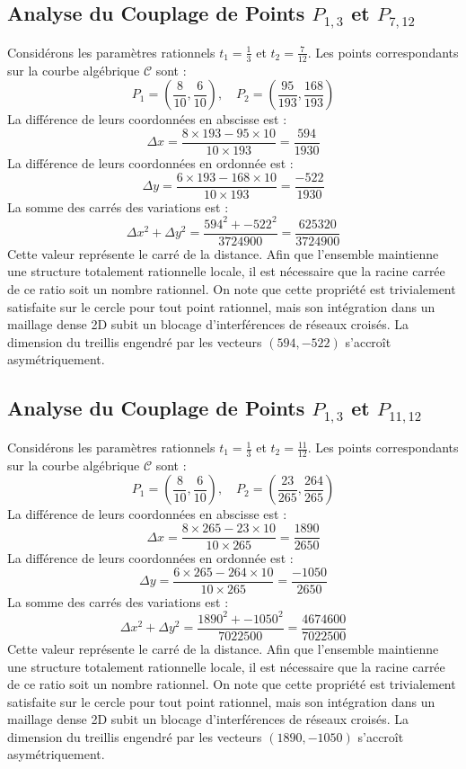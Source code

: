 \documentclass[12pt, a4paper]{article}
\begin{document}
\subsection{Analyse du Couplage de Points $P_{1,3}$ et $P_{7,12}$}
Considérons les paramètres rationnels $t_1 = \frac{1}{3}$ et $t_2 = \frac{7}{12}$.
Les points correspondants sur la courbe algébrique $\mathcal{C}$ sont :
$$ P_1 = \left( \frac{8}{10}, \frac{6}{10} \right), \quad P_2 = \left( \frac{95}{193}, \frac{168}{193} \right) $$
La différence de leurs coordonnées en abscisse est :
$$ \Delta x = \frac{8 \times 193 - 95 \times 10}{10 \times 193} = \frac{594}{1930} $$
La différence de leurs coordonnées en ordonnée est :
$$ \Delta y = \frac{6 \times 193 - 168 \times 10}{10 \times 193} = \frac{-522}{1930} $$
La somme des carrés des variations est :
$$ \Delta x^2 + \Delta y^2 = \frac{ 594^2 + -522^2 }{ 3724900 } = \frac{ 625320 }{ 3724900 } $$
Cette valeur représente le carré de la distance. Afin que l'ensemble maintienne une structure totalement rationnelle locale, il est nécessaire que la racine carrée de ce ratio soit un nombre rationnel. On note que cette propriété est trivialement satisfaite sur le cercle pour tout point rationnel, mais son intégration dans un maillage dense 2D subit un blocage d'interférences de réseaux croisés. La dimension du treillis engendré par les vecteurs $( 594, -522 )$ s'accroît asymétriquement.


\subsection{Analyse du Couplage de Points $P_{1,3}$ et $P_{11,12}$}
Considérons les paramètres rationnels $t_1 = \frac{1}{3}$ et $t_2 = \frac{11}{12}$.
Les points correspondants sur la courbe algébrique $\mathcal{C}$ sont :
$$ P_1 = \left( \frac{8}{10}, \frac{6}{10} \right), \quad P_2 = \left( \frac{23}{265}, \frac{264}{265} \right) $$
La différence de leurs coordonnées en abscisse est :
$$ \Delta x = \frac{8 \times 265 - 23 \times 10}{10 \times 265} = \frac{1890}{2650} $$
La différence de leurs coordonnées en ordonnée est :
$$ \Delta y = \frac{6 \times 265 - 264 \times 10}{10 \times 265} = \frac{-1050}{2650} $$
La somme des carrés des variations est :
$$ \Delta x^2 + \Delta y^2 = \frac{ 1890^2 + -1050^2 }{ 7022500 } = \frac{ 4674600 }{ 7022500 } $$
Cette valeur représente le carré de la distance. Afin que l'ensemble maintienne une structure totalement rationnelle locale, il est nécessaire que la racine carrée de ce ratio soit un nombre rationnel. On note que cette propriété est trivialement satisfaite sur le cercle pour tout point rationnel, mais son intégration dans un maillage dense 2D subit un blocage d'interférences de réseaux croisés. La dimension du treillis engendré par les vecteurs $( 1890, -1050 )$ s'accroît asymétriquement.
\end{document}
